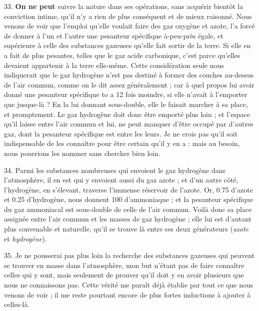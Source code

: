 \documentclass[a4paper, 11pt, oneside, polutonikogreek, french]{article}
\begin{document}
33. \textbf{On ne peut} suivre la nature dans ses opérations, sans acquérir bientôt la conviction intime, qu'il n'y a rien de plus conséquent et de mieux raisonné. Nous venons de voir que l'emploi qu'elle voulait faire des gaz oxygène et azote, l'a forcé de donner à l'un et l'autre une pesanteur spécifique à-peu-près égale, et supérieure à celle des substances gazeuses qu'elle fait sortir de la terre. Si elle en a fait de plus pesantes, telles que le gaz acide carbonique, c'est parce qu'elles devaient appartenir à la terre elle-même. Cette considération seule nous indiquerait que le gaz hydrogène n'est pas destiné à former des couches au-dessus de l'air commun, comme on le dit assez généralement ; car à quel propos lui avoir donné une pesanteur spécifique to a 12 fois moindre, si elle n'avait à l'emporter que jusque-là ? En la lui donnant sous-double, elle le faisait marcher à sa place, et promptement. Le gaz hydrogène doit donc être emporté plus loin ; et l'espace qu'il laisse entre l'air commun et lui, ne peut manquer d'être occupé par d'autres gaz, dont la pesanteur spécifique est entre les leurs. Je ne crois pas qu'il soit indispensable de les connaître pour être certain qu'il y en a : mais au besoin, nous pourrions les nommer sans chercher bien loin.

34. Parmi les substances nombreuses qui envoient le gaz hydrogène dans l'atmosphère, il en est qui y envoient aussi du gaz azote ; et d'un autre côté, l'hydrogène, en s'élevant, traverse l'immense réservoir de l'azote. Or, 0.75 d'azote et 0.25 d'hydrogène, nous donnent 100 d'ammoniaque ; et la pesanteur spécifique du gaz ammoniacal est sous-double de celle de l'air commun. Voilà donc sa place assignée entre l'air commun et les masses de gaz hydrogène ; elle lui est d'autant plus convenable et naturelle, qu'il se trouve là entre ses deux générateurs (\emph{azote} et \emph{hydrogène}).

35. Je ne pousserai pas plus loin la recherche des substances gazeuses qui peuvent se trouver en masse dans l'atmosphère, mon but n'étant pas de faire connaître celles qui y sont, mais seulement de prouver qu'il doit y en avoir plusieurs que nous ne connaissons pas. Cette vérité me paraît déjà établie par tout ce que nous venons de voir ; il me reste pourtant encore de plus fortes inductions à ajouter à celles-là.
\end{document}
